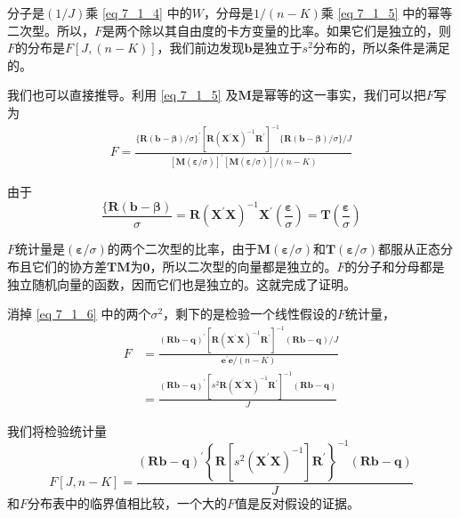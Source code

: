	分子是$ \left ( 1/J \right )  $乘 \ref{eq 7_1_4} 中的$ W $，分母是$ 1 /\left ( n-K \right ) $乘 \ref{eq 7_1_5}  中的幂等二次型。所以，$ F $是两个除以其自由度的卡方变量的比率。如果它们是独立的，则$ F $的分布是$ F\left [ J,\left (n - K\right ) \right ] $，我们前边发现$ \boldsymbol{b} $是独立于$ s^{2} $分布的，所以条件是满足的。
	
	我们也可以直接推导。利用 \ref{eq 7_1_5} 及$ \boldsymbol{M} $是幂等的这一事实，我们可以把$ F $写为
	\begin{align}
		F=\frac{\{\boldsymbol{R}(\boldsymbol{b}-\boldsymbol{\beta}) / \sigma\}^{\prime}\left[\boldsymbol{R}\left(\boldsymbol{X^{\prime} X}\right)^{-1} \boldsymbol{R}^{\prime}\right]^{-1}\{\boldsymbol{R}(\boldsymbol{b}-\boldsymbol{\beta}) / \sigma\} / J}{[\boldsymbol{M}(\boldsymbol{\varepsilon} / \sigma)]^{\prime}[\boldsymbol{M}(\boldsymbol{\varepsilon} / \sigma)] /(n-K)}
	\end{align}

	由于
	$$\frac{\{\boldsymbol{R}(\boldsymbol{b}-\boldsymbol{\beta})}{\sigma}=\boldsymbol{R}
	\left(\boldsymbol{X^{\prime} X}\right)^{-1} \boldsymbol{X}^{\prime}
	\left(\frac{\boldsymbol{\varepsilon}}{\sigma}\right)=\boldsymbol{T}\left(\frac{\boldsymbol{\varepsilon}}{\sigma}\right) $$

	$ F $统计量是$ \left ( \boldsymbol{\varepsilon} / \sigma\right ) $的两个二次型的比率，由于$ \boldsymbol{M}(\boldsymbol{\varepsilon} / \sigma) $和$ \boldsymbol{T}(\boldsymbol{\varepsilon} / \sigma) $都服从正态分布且它们的协方差$ \boldsymbol{TM} $为$ \boldsymbol{0} $，所以二次型的向量都是独立的。$ F $的分子和分母都是独立随机向量的函数，因而它们也是独立的。这就完成了证明。
	
	消掉 \ref{eq 7_1_6} 中的两个$ \sigma^{2} $，剩下的是检验一个线性假设的$ F $统计量，
	\begin{equation}
		\begin{aligned}
			F & = \frac{(\boldsymbol{Rb}-\boldsymbol{q})^{\prime}\left[\boldsymbol{R}
				\left(\boldsymbol{X^{\prime} X}\right)^{-1} \boldsymbol{R}^{\prime}\right]^{-1}(\boldsymbol{Rb}-\boldsymbol{q}) / J}{\boldsymbol{e}^{\prime} \boldsymbol{e} /(n-K)} \\
			  & = \frac{(\boldsymbol{Rb}-\boldsymbol{q})^{\prime}\left[s^{2} \boldsymbol{R}\left(\boldsymbol{X^{\prime} X}\right)^{-1} \boldsymbol{R}^{\prime}\right]^{-1}(\boldsymbol{Rb}-\boldsymbol{q})}{J}
		\end{aligned}
	\end{equation}

	我们将检验统计量
	$$ F[J, n-K]
	=\frac{(\boldsymbol{Rb}-\boldsymbol{q})^{\prime}\left\{\boldsymbol{R}\left[s^{2}\left(\boldsymbol{X}^{\prime} \boldsymbol{X}\right)^{-1}\right] \boldsymbol{R}^{\prime}\right\}^{-1}(\boldsymbol{Rb}-\boldsymbol{q})}{J} $$
	和$ F $分布表中的临界值相比较，一个大的$ F $值是反对假设的证据。		
	
